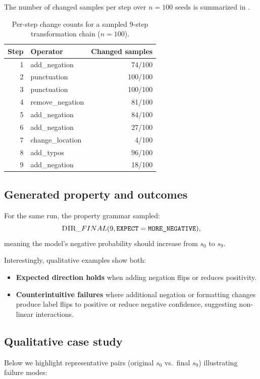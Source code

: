 \documentclass[11pt]{article}
\newcommand{\DIR}{\textsc{DIR}}
\begin{document}
The number of changed samples per step over $n=100$ seeds is summarized in .

\begin{table}[H]
\centering
\caption{Per-step change counts for a sampled 9-step transformation chain ($n=100$).}
\label{tab:stepchange}
\begin{tabular}{@{}r l r@{}}
\toprule
Step & Operator & Changed samples \\
\midrule
1 & add\_negation & 74/100 \\
2 & punctuation & 100/100 \\
3 & punctuation & 100/100 \\
4 & remove\_negation & 81/100 \\
5 & add\_negation & 84/100 \\
6 & add\_negation & 27/100 \\
7 & change\_location & 4/100 \\
8 & add\_typos & 96/100 \\
9 & add\_negation & 18/100 \\
\bottomrule
\end{tabular}
\end{table}

\subsection{Generated property and outcomes}
For the same run, the property grammar sampled:
\[
\DIR\_FINAL(9,\texttt{EXPECT}=\texttt{MORE\_NEGATIVE}),
\]
meaning the model's negative probability should increase from $s_0$ to $s_9$.

Interestingly, qualitative examples show both:
\begin{itemize}
  \item \textbf{Expected direction holds} when adding negation flips or reduces positivity.
  \item \textbf{Counterintuitive failures} where additional negation or formatting changes produce label flips to positive or reduce negative confidence, suggesting non-linear interactions.
\end{itemize}

\subsection{Qualitative case study}
Below we highlight representative pairs (original $s_0$ vs.\ final $s_9$) illustrating failure modes:
\end{document}
